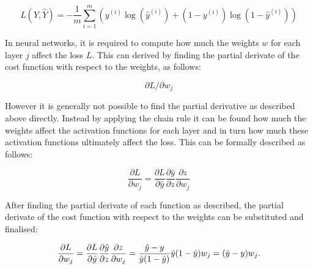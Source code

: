 \begin{equation}
L(Y, \hat{Y}) = -\frac{1}{m} \sum_{i=1}^m \left( y^{(i)} \log(\hat{y}^{(i)}) + (1-y^{(i)}) \log(1-\hat{y}^{(i)}) \right)
\end{equation}


In neural networks, it is required to compute how much the weights $w$ for each layer $j$  affect  the loss $L$. This can derived by finding the partial derivate of the cost function with respect to the weights, as follows:

\begin{equation}
\partial L / \partial w_j
\end{equation}

However it is generally not possible to find the partial derivative as described above directly. Instead by applying the chain rule it can be found how much the weights affect the activation functions for each layer and in turn how much these activation functions ultimately affect the loss. This can be formally described as follows:

\begin{equation}
\frac{\partial L}{\partial w_j} = \frac{\partial L}{\partial \hat{y}} \frac{\partial \hat{y}}{\partial z} \frac{\partial z}{\partial w_j}
\end{equation}

After finding the partial derivate of each function as described, the partial derivate of the cost function with respect to the weights can be substituted and finalised:

\begin{equation}
    \frac{\partial L}{\partial w_j} = \frac{\partial L}{\partial \hat{y}} \frac{\partial \hat{y}}{\partial z} \frac{\partial z}{\partial w_j}\newline
    = \frac{\hat{y} - y}{\hat{y}(1 - \hat{y})} \hat{y} (1-\hat{y}) w_j\newline
    = (\hat{y} - y) w_j.\newline
 \end{equation}

